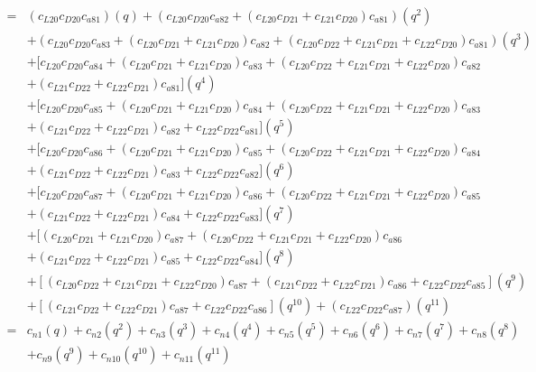 \documentclass[12pt]{article}
\begin{document}
\begin{align}
    =& (c_{L20}c_{D20}c_{a81})(q) + (c_{L20}c_{D20}c_{a82} + (c_{L20}c_{D21} + c_{L21}c_{D20})c_{a81})(q^2) \nonumber\\
    &+ (c_{L20}c_{D20}c_{a83} + (c_{L20}c_{D21} + c_{L21}c_{D20})c_{a82} + (c_{L20}c_{D22} + c_{L21}c_{D21} + c_{L22}c_{D20})c_{a81})(q^3) \nonumber\\
    &+ [c_{L20}c_{D20}c_{a84} + (c_{L20}c_{D21} + c_{L21}c_{D20})c_{a83} + (c_{L20}c_{D22} + c_{L21}c_{D21} + c_{L22}c_{D20})c_{a82} \nonumber\\
    &+ (c_{L21}c_{D22} + c_{L22}c_{D21})c_{a81}](q^4) \nonumber\\
    &+ [c_{L20}c_{D20}c_{a85} + (c_{L20}c_{D21} + c_{L21}c_{D20})c_{a84} + (c_{L20}c_{D22} + c_{L21}c_{D21} + c_{L22}c_{D20})c_{a83} \nonumber\\
    &+ (c_{L21}c_{D22} + c_{L22}c_{D21})c_{a82} + c_{L22}c_{D22}c_{a81}](q^5) \nonumber\\
    &+ [c_{L20}c_{D20}c_{a86} + (c_{L20}c_{D21} + c_{L21}c_{D20})c_{a85} + (c_{L20}c_{D22} + c_{L21}c_{D21} + c_{L22}c_{D20})c_{a84} \nonumber\\
    &+ (c_{L21}c_{D22} + c_{L22}c_{D21})c_{a83} + c_{L22}c_{D22}c_{a82} ](q^6) \nonumber\\
    &+ [c_{L20}c_{D20}c_{a87} + (c_{L20}c_{D21} + c_{L21}c_{D20})c_{a86} + (c_{L20}c_{D22} + c_{L21}c_{D21} + c_{L22}c_{D20})c_{a85} \nonumber\\
    &+ (c_{L21}c_{D22} + c_{L22}c_{D21})c_{a84} + c_{L22}c_{D22}c_{a83} ](q^7) \nonumber\\
    &+ [(c_{L20}c_{D21} + c_{L21}c_{D20})c_{a87} + (c_{L20}c_{D22} + c_{L21}c_{D21} + c_{L22}c_{D20})c_{a86} \nonumber\\
    &+ (c_{L21}c_{D22} + c_{L22}c_{D21})c_{a85} + c_{L22}c_{D22}c_{a84}](q^8) \nonumber\\
    &+ [(c_{L20}c_{D22} + c_{L21}c_{D21} + c_{L22}c_{D20})c_{a87} + (c_{L21}c_{D22} + c_{L22}c_{D21})c_{a86} + c_{L22}c_{D22}c_{a85}](q^9) \nonumber\\
    &+ [(c_{L21}c_{D22} + c_{L22}c_{D21})c_{a87} + c_{L22}c_{D22}c_{a86}](q^{10}) + (c_{L22}c_{D22}c_{a87})(q^{11}) \\
    =& c_{n1}(q) + c_{n2}(q^2) + c_{n3}(q^3) + c_{n4}(q^4) + c_{n5}(q^5) + c_{n6}(q^6) + c_{n7}(q^7) + c_{n8}(q^8) \nonumber\\
    &+ c_{n9}(q^9) + c_{n10}(q^{10}) + c_{n11}(q^{11})
\end{align}
\end{document}
